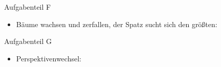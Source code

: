 \documentclass{beamer}
\begin{document}
\begin{frame}{Aufgabenteil F}
\begin{itemize}
\item Bäume wachsen und zerfallen, der Spatz sucht sich den größten:
\end{itemize}
\begin{figure}
    \centering
\end{figure}
\end{frame}

\begin{frame}{Aufgabenteil G}
\begin{itemize}
\item Perspektivenwechsel:
\end{itemize}
\begin{figure}
    \centering
\end{figure}
\end{frame}
\end{document}

